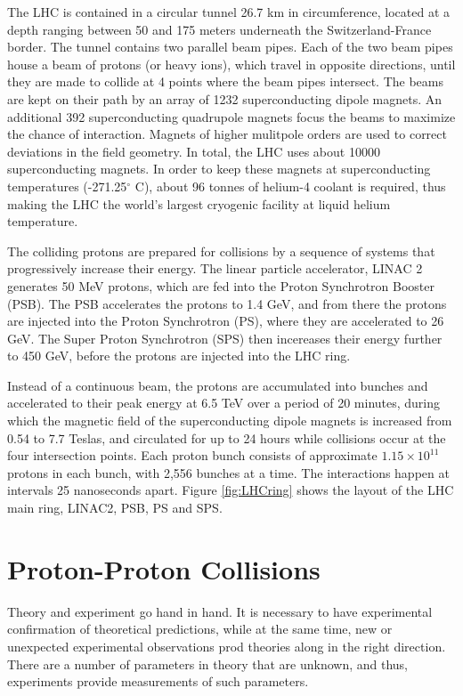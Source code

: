 \documentclass[11pt,a4paper,openright,twoside]{report}
\begin{document}
The LHC is contained in a circular tunnel 26.7 km in circumference, located at a depth ranging between 50 and 175 meters underneath the Switzerland-France border. The tunnel contains two parallel beam pipes. Each of the two beam pipes house a beam of protons (or heavy ions), which travel in opposite directions, until they are made to collide at 4 points where the beam pipes intersect. The beams are kept on their path by an array of 1232 superconducting dipole magnets. An additional 392 superconducting quadrupole magnets focus the beams to maximize the chance of interaction. Magnets of higher mulitpole orders are used to correct deviations in the field geometry. In total, the LHC uses about 10000 superconducting magnets. In order to keep these magnets at superconducting temperatures (-271.25$^\circ$ C), about 96 tonnes of helium-4 coolant is required, thus making the LHC the world's largest cryogenic facility at liquid helium temperature.

The colliding protons are prepared for collisions by a sequence of systems that progressively increase their energy. The linear particle accelerator, LINAC 2 generates 50 MeV protons, which are fed into the Proton Synchrotron Booster (PSB). The PSB accelerates the protons to 1.4 GeV, and from there the protons are injected into the Proton Synchrotron (PS), where they are accelerated to 26 GeV. The Super Proton Synchrotron (SPS) then incereases their energy further to 450 GeV, before the protons are injected into the LHC ring. 

Instead of a continuous beam, the protons are accumulated into bunches and accelerated to their peak energy at 6.5 TeV over a period of 20 minutes, during which the magnetic field of the superconducting dipole magnets is increased from 0.54 to 7.7 Teslas, and circulated for up to 24 hours while collisions occur at the four intersection points. Each proton bunch consists of approximate $1.15\times 10^{11}$ protons in each bunch, with 2,556 bunches \cite{bunch} at a time. The interactions happen at intervals 25 nanoseconds apart. Figure \ref{fig:LHCring} shows the layout of the LHC main ring, LINAC2, PSB, PS and SPS.

\section{Proton-Proton Collisions}
Theory and experiment go hand in hand. It is necessary to have experimental confirmation of theoretical predictions, while at the same time, new or unexpected experimental observations prod theories along in the right direction. There are a number of parameters in theory that are unknown, and thus, experiments provide measurements of such parameters. 
\end{document}
